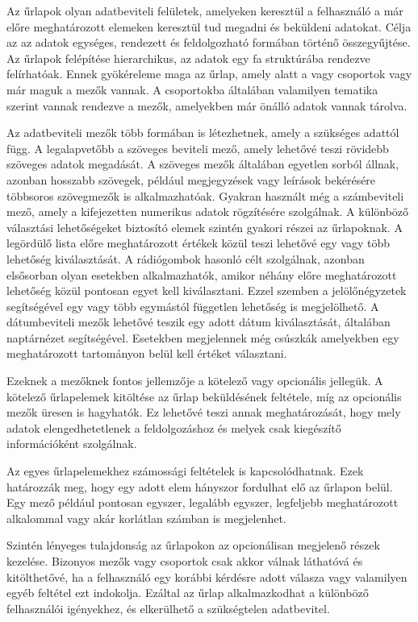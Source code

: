 
Az űrlapok olyan adatbeviteli felületek, amelyeken keresztül a felhasználó a már előre meghatározott elemeken keresztül tud megadni és beküldeni adatokat. Célja az az adatok egységes, rendezett és feldolgozható formában történő összegyűjtése. Az űrlapok felépítése hierarchikus, az adatok egy fa struktúrába rendezve felírhatóak. Ennek gyökéreleme maga az űrlap, amely alatt a vagy csoportok vagy már maguk a mezők vannak. A csoportokba általában valamilyen tematika szerint vannak rendezve a mezők, amelyekben már önálló adatok vannak tárolva.

Az adatbeviteli mezők több formában is létezhetnek, amely a szükséges adattól függ. A legalapvetőbb a szöveges beviteli mező, amely lehetővé teszi rövidebb szöveges adatok megadását. A szöveges mezők általában egyetlen sorból állnak, azonban hosszabb szövegek, például megjegyzések vagy leírások bekérésére többsoros szövegmezők is alkalmazhatóak. Gyakran használt még a számbeviteli mező, amely a kifejezetten numerikus adatok rögzítésére szolgálnak. A különböző választási lehetőségeket biztosító elemek szintén gyakori részei az űrlapoknak. A legördülő lista előre meghatározott értékek közül teszi lehetővé egy vagy több lehetőség kiválasztását. A rádiógombok hasonló célt szolgálnak, azonban elsősorban olyan esetekben alkalmazhatók, amikor néhány előre meghatározott lehetőség közül pontosan egyet kell kiválasztani. Ezzel szemben a jelölőnégyzetek segítségével egy vagy több egymástól független lehetőség is megjelölhető. A dátumbeviteli mezők lehetővé teszik egy adott dátum kiválasztását, általában naptárnézet segítségével. Esetekben megjelennek még csúszkák amelyekben egy meghatározott tartományon belül kell értéket választani.

Ezeknek a mezőknek fontos jellemzője a kötelező vagy opcionális jellegük. A kötelező űrlapelemek kitöltése az űrlap beküldésének feltétele, míg az opcionális mezők üresen is hagyhatók. Ez lehetővé teszi annak meghatározását, hogy mely adatok elengedhetetlenek a feldolgozáshoz és melyek csak kiegészítő információként szolgálnak.

Az egyes űrlapelemekhez számossági feltételek is kapcsolódhatnak. Ezek határozzák meg, hogy egy adott elem hányszor fordulhat elő az űrlapon belül. Egy mező például pontosan egyszer, legalább egyszer, legfeljebb meghatározott alkalommal vagy akár korlátlan számban is megjelenhet.

Szintén lényeges tulajdonság az űrlapokon az opcionálisan megjelenő részek kezelése. Bizonyos mezők vagy csoportok csak akkor válnak láthatóvá és kitölthetővé, ha a felhasználó egy korábbi kérdésre adott válasza vagy valamilyen egyéb feltétel ezt indokolja. Ezáltal az űrlap alkalmazkodhat a különböző felhasználói igényekhez, és elkerülhető a szükségtelen adatbevitel.

